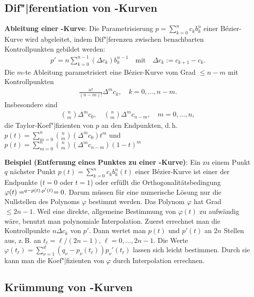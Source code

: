 \subsection{%
    Dif"|ferentiation von -Kurven%
}

\textbf{Ableitung einer -Kurve}:
Die Parametrisierung $p = \sum_{k=0}^n c_k b_k^n$ einer Bézier-Kurve wird abgeleitet, indem
Dif"|ferenzen zwischen benachbarten Kontrollpunkten gebildet werden:
\begin{align*}
    p' = n \sum_{k=0}^{n-1} (\Delta c_k) b_k^{n-1}\quad\text{mit}\quad
    \Delta c_k := c_{k+1} - c_k.
\end{align*}
Die $m$-te Ableitung parametrisiert eine Bézier-Kurve vom Grad $\le n - m$ mit Kontrollpunkten
\begin{align*}
    \frac{n!}{(n - m)!} \Delta^m c_k,\quad
    k = 0, \dotsc, n - m.
\end{align*}
Insbesondere sind
\begin{align*}
    \binom{n}{m} \Delta^m c_0,\quad
    \binom{n}{m} \Delta^m c_{n-m},\quad
    m = 0, \dotsc, n,
\end{align*}
die Taylor-Koef"|fizienten von $p$ an den Endpunkten, d.\,h.
$p(t) = \sum_{m=0}^n \binom{n}{m} (\Delta^m c_0) t^m$ und\\
$p(t) = \sum_{m=0}^n \binom{n}{m} (\Delta^m c_{n-m}) (1 - t)^m$

\linie

\textbf{Beispiel (Entfernung eines Punktes zu einer -Kurve)}:
Ein zu einem Punkt $q$ nächster Punkt $p(t) = \sum_{k=0}^n c_k b_k^n(t)$ einer Bézier-Kurve ist
einer der Endpunkte ($t = 0$ oder $t = 1$) oder erfüllt die Orthogonalitätsbedingung
$\varphi(t) = \sp{q - p(t), p'(t)} = 0$.
Darum müssen für eine numerische Lösung nur die Nullstellen des Polynoms $\varphi$
bestimmt werden.
Das Polynom $\varphi$ hat Grad $\le 2n - 1$.
Weil eine direkte, allgemeine Bestimmung von $\varphi(t)$ zu aufwändig wäre,
benutzt man polynomiale Interpolation.
Zuerst errechnet man die Kontrollpunkte $n \Delta c_k$ von $p'$.
Dann wertet man $p(t)$ und $p'(t)$ an $2n$ Stellen aus, z.\,B. an $t_\ell = \ell/(2n - 1)$,
$\ell = 0, \dotsc, 2n - 1$.
Die Werte $\varphi(t_\ell) = \sum_{\nu=1}^d (q_\nu - p_\nu(t_\ell)) p_\nu'(t_\ell)$
lassen sich leicht bestimmen.
Durch sie kann man die Koef"|fizienten von $\varphi$ durch Interpolation errechnen.

\subsection{%
    Krümmung von -Kurven%
}

